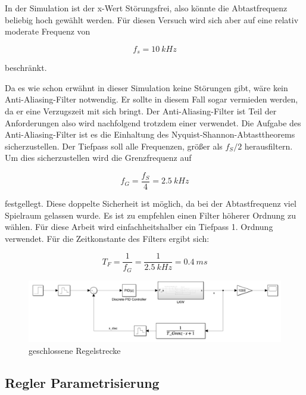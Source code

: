 In der Simulation ist der x-Wert Störungsfrei, also könnte die Abtastfrequenz beliebig hoch gewählt werden.
Für diesen Versuch wird sich aber auf eine relativ moderate Frequenz von 

\begin{equation}
	f_{s} = \SI{10}{kHz}
\end{equation}

beschränkt.

Da es wie schon erwähnt in dieser Simulation keine Störungen gibt, wäre kein Anti-Aliasing-Filter notwendig. Er sollte in diesem Fall sogar vermieden werden,
da er eine Verzugszeit mit sich bringt.
Der Anti-Aliasing-Filter ist Teil der Anforderungen also wird nachfolgend trotzdem einer verwendet.
Die Aufgabe des Anti-Aliasing-Filter ist es die Einhaltung des Nyquist-Shannon-Abtasttheorems sicherzustellen. Der Tiefpass soll alle Frequenzen, 
größer als $f_{S} / 2$ herausfiltern. Um dies sicherzustellen wird die Grenzfrequenz auf

\begin{equation}
	f_{G} = \frac{f_{S}}{4} = \SI{2,5}{kHz} 
\end{equation}

festgellegt. Diese doppelte Sicherheit ist möglich, da bei der Abtastfrequenz viel Spielraum gelassen wurde. Es ist zu empfehlen einen Filter höherer Ordnung zu 
wählen. Für diese Arbeit wird einfachheitshalber ein Tiefpass 1. Ordnung verwendet.
Für die Zeitkonstante des Filters ergibt sich:

\begin{equation}
	T_{F} =  \frac{1}{f_{G}} = \frac{1}{\SI{2.5}{kHz}} = \SI{0,4}{ms}
\end{equation}


\begin{figure}[hbt] 
	\centering
		\includegraphics[width=1.0\textwidth]{Bilder/geschlosseneRegelstrecke.PNG}
	\caption{geschlossene Regelstrecke}
	\label{geschlosseneRegelstrecke}
\end{figure}

\subsection{Regler Parametrisierung}


